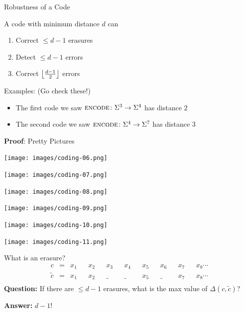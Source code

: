 \documentclass[aspectratio=169]{beamer}
\begin{document}
\begin{frame}{Robustness of a Code}
    \begin{thrm}
        A code with minimum distance $d$ can
        \begin{enumerate}
            \item Correct $\leq d - 1$ erasures
            \item Detect $\leq d - 1$ errors
            \item Correct $\left\lfloor \frac{d - 1}{2} \right\rfloor$ errors
        \end{enumerate}
    \end{thrm} \pause
    
    \textcolor{sigma@mainblue}{Examples:} (Go check these!)
    \begin{itemize}
        \item The first code we saw $\textsc{encode}\colon \Sigma^3 \to \Sigma^4$ has distance $2$
        \item The second code we saw $\textsc{encode}\colon \Sigma^4 \to \Sigma^7$ has distance $3$
    \end{itemize} \pause

    \textcolor{sigma@mainblue}{\textbf{Proof}:} Pretty Pictures
\end{frame}

\begin{frame}{}
    \texttt{[image: images/coding-06.png]}
\end{frame}
\begin{frame}{}
    \texttt{[image: images/coding-07.png]}
\end{frame}
\begin{frame}{}
    \texttt{[image: images/coding-08.png]}
\end{frame}
\begin{frame}{}
    \texttt{[image: images/coding-09.png]}
\end{frame}
\begin{frame}{}
    \texttt{[image: images/coding-10.png]}
\end{frame}
\begin{frame}{}
    \texttt{[image: images/coding-11.png]}
\end{frame}

\begin{frame}{}
    What is an erasure?
    \begin{align*}
        c &=         &x_1 && x_2 && x_3 && x_4 && x_5 && x_6 && x_7 && x_8\cdots \\
        \tilde{c} &= &x_1 && x_2 && \_  && \_  && x_5 && \_  && x_7 && x_8\cdots \\
    \end{align*}
    \textcolor{sigma@alertred}{\textbf{Question:}} If there are $\leq d - 1$ erasures, what is the max value of $\Delta(c, \tilde{c})$? \pause

    \textcolor{sigma@mainblue}{\textbf{Answer:}} $d - 1$!
\end{frame}
\end{document}
